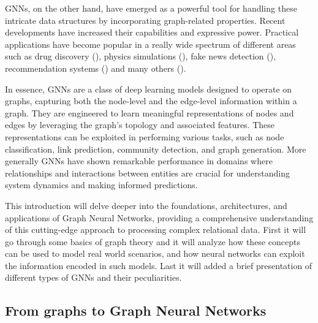 \documentclass[binding=0.6cm]{sapthesis}
\newcommand{\mycite}[1]{(\cite{#1})}
\begin{document}
GNNs, on the other hand, have emerged as a powerful tool for handling these intricate data structures by incorporating graph-related properties. Recent developments have increased their capabilities and expressive power. Practical applications have become popular in a really wide spectrum of different areas such as drug discovery \mycite{doi:10.1021/acs.jmedchem.9b00959}, physics simulations \mycite{sanchezgonzalez2020learning}, fake news detection \mycite{monti2019fake}, recommendation systems \mycite{eksombatchai2017pixie} and many others \mycite{hamilton2020graph}.

In essence, GNNs are a class of deep learning models designed to operate on graphs, capturing both the node-level and the edge-level information within a graph. They are engineered to learn meaningful representations of nodes and edges by leveraging the graph's topology and associated features. These representations can be exploited in performing various tasks, such as node classification, link prediction, community detection, and graph generation. More generally GNNs have shown remarkable performance in domains where relationships and interactions between entities are crucial for understanding system dynamics and making informed predictions.

This introduction will delve deeper into the foundations, architectures, and applications of Graph Neural Networks, providing a comprehensive understanding of this cutting-edge approach to processing complex relational data. First it will go through some basics of graph theory and it will analyze how these concepts can be used to model real world scenarios, and how neural networks  can exploit the information encoded in such models. Last it will added a brief presentation of different types of GNNs and their peculiarities.

\subsection{From graphs to Graph Neural Networks}
\label{sec:bg.gnn.graph-base}
\end{document}
